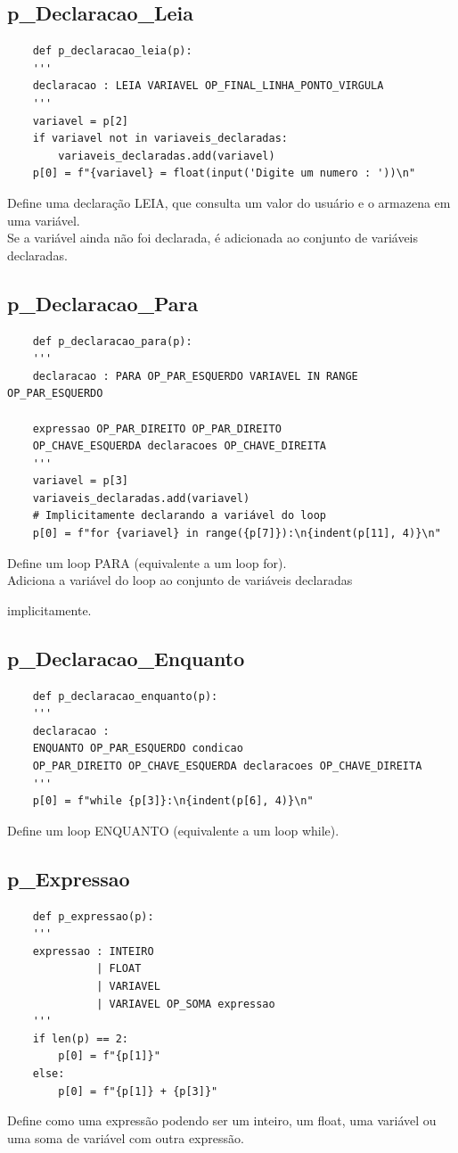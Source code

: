 \documentclass[a4paper,12pt]{article}
\begin{document}
\subsection{p\_Declaracao\_Leia}
\begin{verbatim}
    def p_declaracao_leia(p):
    '''
    declaracao : LEIA VARIAVEL OP_FINAL_LINHA_PONTO_VIRGULA
    '''
    variavel = p[2]
    if variavel not in variaveis_declaradas:
        variaveis_declaradas.add(variavel)
    p[0] = f"{variavel} = float(input('Digite um numero : '))\n"
\end{verbatim}
Define uma declaração LEIA, que consulta um valor do usuário e o 
armazena em uma variável.\\
Se a variável ainda não foi declarada, é adicionada ao conjunto de 
variáveis declaradas.

\subsection{p\_Declaracao\_Para}

\begin{verbatim}
    def p_declaracao_para(p):
    '''
    declaracao : PARA OP_PAR_ESQUERDO VARIAVEL IN RANGE OP_PAR_ESQUERDO 
    
    expressao OP_PAR_DIREITO OP_PAR_DIREITO 
    OP_CHAVE_ESQUERDA declaracoes OP_CHAVE_DIREITA
    '''
    variavel = p[3]
    variaveis_declaradas.add(variavel)  
    # Implicitamente declarando a variável do loop
    p[0] = f"for {variavel} in range({p[7]}):\n{indent(p[11], 4)}\n"
\end{verbatim}

Define um loop PARA (equivalente a um loop for).\\
Adiciona a variável do loop ao conjunto de variáveis declaradas 

implicitamente.

\subsection{p\_Declaracao\_Enquanto}

\begin{verbatim}
    def p_declaracao_enquanto(p):
    '''
    declaracao : 
    ENQUANTO OP_PAR_ESQUERDO condicao 
    OP_PAR_DIREITO OP_CHAVE_ESQUERDA declaracoes OP_CHAVE_DIREITA
    '''
    p[0] = f"while {p[3]}:\n{indent(p[6], 4)}\n"
\end{verbatim}
Define um loop ENQUANTO (equivalente a um loop while).

\subsection{p\_Expressao}
\begin{verbatim}
    def p_expressao(p):
    '''
    expressao : INTEIRO
              | FLOAT
              | VARIAVEL
              | VARIAVEL OP_SOMA expressao
    '''
    if len(p) == 2:
        p[0] = f"{p[1]}"
    else:
        p[0] = f"{p[1]} + {p[3]}"
\end{verbatim}
Define como uma expressão podendo ser um inteiro, um float, uma variável 
ou uma soma de variável com outra expressão.
\end{document}
